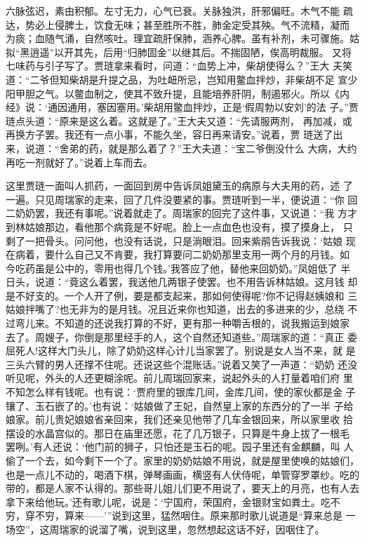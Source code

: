 六脉弦迟，素由积郁。左寸无力，心气已衰。关脉独洪，肝邪偏旺。木气不能
疏达，势必上侵脾土，饮食无味；甚至胜所不胜，肺金定受其殃。气不流精，凝而
为痰；血随气涌，自然咳吐。理宜疏肝保肺，涵养心脾。虽有补剂，未可骤施。姑
拟“黑逍遥”以开其先，后用“归肺固金”以继其后。不揣固陋，俟高明裁服。
又将七味药与引子写了。贾琏拿来看时，问道：“血势上冲，柴胡使得么？”王大
夫笑道：“二爷但知柴胡是升提之品，为吐衄所忌，岂知用鳖血拌炒，非柴胡不足
宣少阳甲胆之气。以鳖血制之，使其不致升提，且能培养肝阴，制遏邪火。所以《内
经》说：‘通因通用，塞因塞用。’柴胡用鳖血拌炒，正是‘假周勃以安刘’的法
子。”贾琏点头道：“原来是这么着。这就是了。”王大夫又道：“先请服两剂，
再加减，或再换方子罢。我还有一点小事，不能久坐，容日再来请安。”说着，贾
琏送了出来，说道：“舍弟的药，就是那么着了？”王大夫道：“宝二爷倒没什么
大病，大约再吃一剂就好了。”说着上车而去。

这里贾琏一面叫人抓药，一面回到房中告诉凤姐黛玉的病原与大夫用的药，述
了一遍。只见周瑞家的走来，回了几件没要紧的事。贾琏听到一半，便说道：“你
回二奶奶罢，我还有事呢。”说着就走了。周瑞家的回完了这件事，又说道：“我
方才到林姑娘那边，看他那个病竟是不好呢。脸上一点血色也没有，摸了摸身上，
只剩了一把骨头。问问他，也没有话说，只是淌眼泪。回来紫鹃告诉我说：‘姑娘
现在病着，要什么自己又不肯要，我打算要问二奶奶那里支用一两个月的月钱。如
今吃药虽是公中的，零用也得几个钱。’我答应了他，替他来回奶奶。”凤姐低了
半日头，说道：“竟这么着罢，我送他几两银子使罢。也不用告诉林姑娘。这月钱
却是不好支的。一个人开了例，要是都支起来，那如何使得呢?你不记得赵姨娘和
三姑娘拌嘴了?也无非为的是月钱。况且近来你也知道，出去的多进来的少，总绕
不过弯儿来。不知道的还说我打算的不好，更有那一种嚼舌根的，说我搬运到娘家
去了。周嫂子，你倒是那里经手的人，这个自然还知道些。”周瑞家的道：“真正
委屈死人!这样大门头儿，除了奶奶这样心计儿当家罢了。别说是女人当不来，就
是三头六臂的男人还撑不住呢。还说这些个混账话。”说着又笑了一声道：“奶奶
还没听见呢，外头的人还更糊涂呢。前儿周瑞回家来，说起外头的人打量着咱们府
里不知怎么样有钱呢。也有说：‘贾府里的银库几间，金库几间，使的家伙都是金
子镶了、玉石嵌了的。’也有说：‘姑娘做了王妃，自然皇上家的东西分的了一半
子给娘家。前儿贵妃娘娘省亲回来，我们还亲见他带了几车金银回来，所以家里收
拾摆设的水晶宫似的。那日在庙里还愿，花了几万银子，只算是牛身上拔了一根毛
罢咧。’有人还说：‘他门前的狮子，只怕还是玉石的呢。园子里还有金麒麟，叫
人偷了一个去，如今剩下一个了。家里的奶奶姑娘不用说，就是屋里使唤的姑娘们，
也是一点儿不动的，喝酒下棋，弹琴画画，横竖有人伏侍呢，单管穿罗罩纱。吃的
带的，都是人家不认得的。那些哥儿姐儿们更不用说了，要天上的月亮，也有人去
拿下来给他玩。’还有歌儿呢，说是：‘宁国府，荣国府，金银财宝如粪土。吃不
穷，穿不穷，算来——’”说到这里，猛然咽住。原来那时歌儿说道是“算来总是
一场空”，这周瑞家的说溜了嘴，说到这里，忽然想起这话不好，因咽住了。

